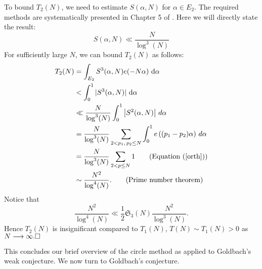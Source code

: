 \documentclass{article}
\begin{document}
To bound $T_2(N)$, we need to estimate $S(\alpha, N)$ for $\alpha \in E_2$. The required methods are systematically presented in Chapter 5 of \cite{pan}. Here we will directly state the result:
\begin{equation*}
    S(\alpha, N) \ll \frac{N}{\log^3(N)}
\end{equation*}
For sufficiently large $N$, we can bound $T_2(N)$ as follows: 
\begin{align*}
T_2(N) &= \int_{E_2} S^3(\alpha, N)e(-N\alpha)\ \mathrm{d}\alpha\\
       & < \int_{0}^1 |S^3(\alpha, N)|\ \mathrm{d}\alpha\\
       &\ll \frac{N}{\log^3 (N)} \int_0^1 \left| S^2(\alpha, N) \right| \, d\alpha \\
        &= \frac{N}{\log^3 (N)} \sum_{2 < p_1,\, p_2 \leq N} \int_0^1  e\left((p_1 - p_2)\alpha\right) \, d\alpha \\
        &= \frac{N}{\log^3 (N)} \sum_{2 < p \leq N} 1 \tag{Equation (\ref{orth})}\\
       &\sim \frac{N^2}{\log^4 (N)}. \tag{Prime number theorem}
\end{align*}
Notice that 
\begin{equation*}
    \frac{N^2}{\log^4(N)} \ll \frac{1}{2} \mathfrak{S}_3(N) \frac{N^2}{\log^3 (N)}.
\end{equation*} 
Hence $T_2(N)$ is insignificant compared to $T_1(N)$, $T(N) \sim T_1(N) > 0$ as $N \longrightarrow \infty. \hfill \square$

This concludes our brief overview of the circle method as applied to Goldbach’s weak conjecture. We now turn to Goldbach's conjecture.
\end{document}
